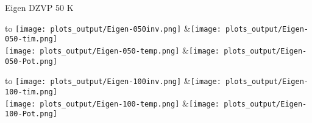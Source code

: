 \documentclass[a4paper,10pt]{report}
\title{}
\author{}
\begin{document}
\maketitle



\begin{table}[ht]
\caption{Eigen DZVP 50 K}
\centering
\begin{tabu}to \textwidth {X[c]X[c]}
 \texttt{[image: plots\_output/Eigen-050inv.png]} &\texttt{[image: plots\_output/Eigen-050-tim.png]}  \\
 \texttt{[image: plots\_output/Eigen-050-temp.png]} &\texttt{[image: plots\_output/Eigen-050-Pot.png]} \\
\end{tabu}

\caption{Eigen DZVP 100 K}
\centering
\begin{tabu}to \textwidth {X[c]X[c]}
 \texttt{[image: plots\_output/Eigen-100inv.png]} &\texttt{[image: plots\_output/Eigen-100-tim.png]}  \\
 \texttt{[image: plots\_output/Eigen-100-temp.png]} &\texttt{[image: plots\_output/Eigen-100-Pot.png]} \\
\end{tabu}


\end{table}
\end{document}
